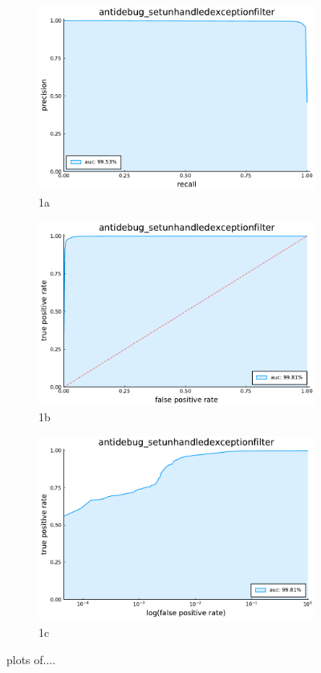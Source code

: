   \begin{figure}
    \centering
    \begin{subfigure}{.33\textwidth}
      \centering
      \includegraphics[width=.8\linewidth]{pdfs/modperf/antidebug_setunhandledexceptionfilter.bson-pr.pdf}
      \caption{1a}
      \label{fig:sfig1}
    \end{subfigure}%
    \begin{subfigure}{.33\textwidth}
      \centering
      \includegraphics[width=.8\linewidth]{pdfs/modperf/antidebug_setunhandledexceptionfilter.bson-roc.pdf}
      \caption{1b}
      \label{fig:sfig2}
    \end{subfigure}
    \begin{subfigure}{.33\textwidth}
        \centering
        \includegraphics[width=.8\linewidth]{pdfs/modperf/antidebug_setunhandledexceptionfilter.bson-roclog.pdf}
        \caption{1c}
        \label{fig:sfig3}
    \end{subfigure}
    \caption{plots of....}
    \label{fig:fig}
\end{figure}


